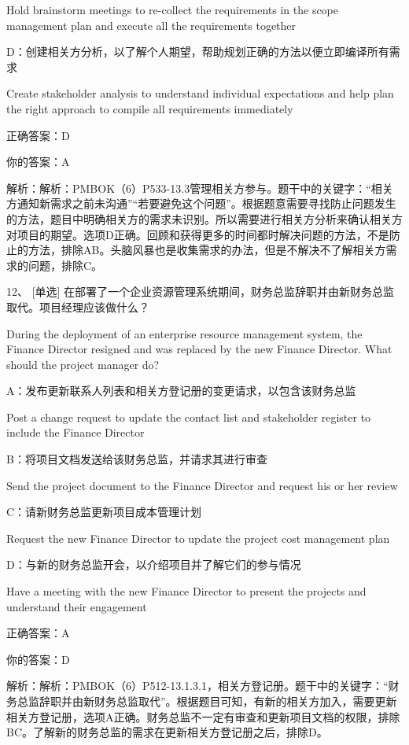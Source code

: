 Hold brainstorm meetings to re-collect the requirements in the scope management plan and execute all the requirements together

D：创建相关方分析，以了解个人期望，帮助规划正确的方法以便立即编译所有需求

Create stakeholder analysis to understand individual expectations and help plan the right approach to compile all requirements immediately

正确答案：D

你的答案：A

解析：解析：PMBOK（6）P533-13.3管理相关方参与。题干中的关键字：“相关方通知新需求之前未沟通”“若要避免这个问题”。根据题意需要寻找防止问题发生的方法，题目中明确相关方的需求未识别。所以需要进行相关方分析来确认相关方对项目的期望。选项D正确。回顾和获得更多的时间都时解决问题的方法，不是防止的方法，排除AB。头脑风暴也是收集需求的办法，但是不解决不了解相关方需求的问题，排除C。

12、 [单选] 在部署了一个企业资源管理系统期间，财务总监辞职并由新财务总监取代。项目经理应该做什么？

During the deployment of an enterprise resource management system, the Finance Director resigned and was replaced by the new Finance Director. What should the project manager do?

A：发布更新联系人列表和相关方登记册的变更请求，以包含该财务总监

Post a change request to update the contact list and stakeholder register to include the Finance Director

B：将项目文档发送给该财务总监，并请求其进行审查

Send the project document to the Finance Director and request his or her review

C：请新财务总监更新项目成本管理计划

Request the new Finance Director to update the project cost management plan

D：与新的财务总监开会，以介绍项目并了解它们的参与情况

Have a meeting with the new Finance Director to present the projects and understand their engagement

正确答案：A

你的答案：D

解析：解析：PMBOK（6）P512-13.1.3.1，相关方登记册。题干中的关键字：“财务总监辞职并由新财务总监取代”。根据题目可知，有新的相关方加入，需要更新相关方登记册，选项A正确。财务总监不一定有审查和更新项目文档的权限，排除BC。了解新的财务总监的需求在更新相关方登记册之后，排除D。

